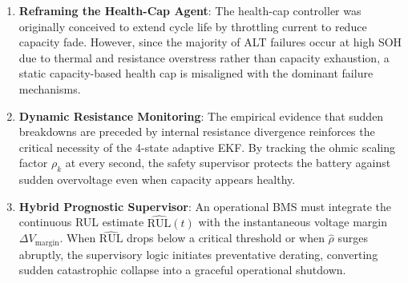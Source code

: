 \begin{enumerate}
  \item \textbf{Reframing the Health-Cap Agent}: The health-cap controller
  was originally conceived to extend cycle life by throttling current to
  reduce capacity fade. However, since the majority of ALT failures occur
  at high SOH due to thermal and resistance overstress rather than capacity
  exhaustion, a static capacity-based health cap is misaligned with the
  dominant failure mechanisms.
  \item \textbf{Dynamic Resistance Monitoring}: The empirical evidence that
  sudden breakdowns are preceded by internal resistance divergence reinforces
  the critical necessity of the 4-state adaptive EKF. By tracking the ohmic
  scaling factor $\rho_k$ at every second, the safety supervisor protects
  the battery against sudden overvoltage even when capacity appears healthy.
  \item \textbf{Hybrid Prognostic Supervisor}: An operational BMS must
  integrate the continuous RUL estimate $\widehat{\mathrm{RUL}}(t)$ with the
  instantaneous voltage margin $\Delta V_{\mathrm{margin}}$. When
  $\widehat{\mathrm{RUL}}$ drops below a critical threshold or when
  $\hat{\rho}$ surges abruptly, the supervisory logic initiates
  preventative derating, converting sudden catastrophic collapse into a
  graceful operational shutdown.
\end{enumerate}
